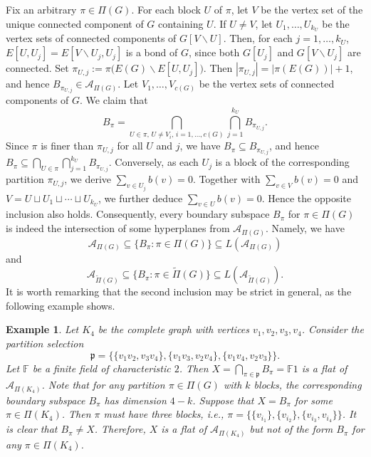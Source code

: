 \documentclass[12pt]{article}%
\renewcommand*{\bm}[1]{#1}%
\numberwithin{equation}{section}
\newtheorem{example}[example]{Example}
\begin{document}
Fix an arbitrary $\pi\in\Pi(G)$. For each block $U$ of $\pi$, let $V$ be the vertex set of the unique connected component of $G$ containing $U$. If $U\ne V$, let $U_1,\ldots,U_{k_U}$ be the vertex sets of connected components of $G[V\smallsetminus U]$. Then, for each $j=1,\ldots,k_U$, $E[U,U_j]=E[V\smallsetminus U_j,U_j]$ is a bond of $G$, since both $G[U_j]$ and $G[V\smallsetminus U_j]$ are connected. Set $\pi_{U,j}:=\pi\big(E(G)\smallsetminus E[U,U_j]\big)$. Then $|\pi_{U,j}|=|\pi(E(G))|+1$, and hence $B_{\pi_{U,j}}\in\mathcal{A}_{\Pi(G)}$. Let $V_1,\ldots, V_{c(G)}$ be the vertex sets of connected components of $G$. We claim that 
\[
B_\pi=\bigcap_{U\in\pi,\, U\ne V_i,\,i=1,\ldots, c(G)}\bigcap_{j=1}^{k_U}B_{\pi_{U,j}}.
\] 
Since $\pi$ is finer than $\pi_{U,j}$ for all $U$ and $j$, we have $B_\pi\subseteq B_{\pi_{U,j}}$, and hence $B_\pi\subseteq\bigcap_{U\in\pi}\bigcap_{j=1}^{k_U}B_{\pi_{U,j}}$. Conversely, as each $U_j$ is a block of the corresponding partition $\pi_{U,j}$, we derive $\sum_{v\in U_j}\bm b(v)=0$. Together with $\sum_{v\in V}\bm b(v)=0$ and $V=U\sqcup U_1\sqcup\cdots\sqcup U_{k_U}$, we further deduce $\sum_{v\in U}\bm b(v)=0$. Hence the opposite inclusion also holds. Consequently, every boundary subspace $B_\pi$ for $\pi\in\Pi(G)$ is indeed the intersection of some hyperplanes from $\mathcal{A}_{\Pi(G)}$. Namely, we have 
\[
\mathcal{A}_{\Pi(G)}\subseteq\big\{B_\pi:\pi\in\Pi(G)\big\}\subseteq L(\mathcal{A}_{\Pi(G)})
\]
and
\begin{equation}\label{Semilattice-Partition}
 \mathcal{A}_{\tilde{\Pi}(G)}\subseteq\big\{B_\pi:\pi\in\tilde{\Pi}(G)\big\}\subseteq L(\mathcal{A}_{\tilde{\Pi}(G)}).
\end{equation}
It is worth remarking that the second inclusion may be strict in general, as the following example shows.
\begin{example}{\rm
Let $K_4$ be the complete graph with vertices $v_1,v_2,v_3,v_4$. Consider the partition selection 
\[
\mathfrak{p}=\big\{\{v_1v_2,v_3v_4\},\{v_1v_3,v_2v_4\},\{v_1v_4,v_2v_3\}\big\}.
\]
Let $\mathbb{F}$ be a finite field of characteristic $2$. Then $X=\bigcap_{\pi\in\mathfrak{p}}B_\pi=\mathbb{F}\bm 1$ is a flat of $\mathcal{A}_{\Pi(K_4)}$. Note that for any partition $\pi\in\Pi(G)$ with $k$ blocks, the corresponding boundary subspace $B_\pi$ has dimension $4-k$. Suppose that $X=B_\pi$ for some $\pi\in\Pi(K_4)$. Then $\pi$ must have three blocks, i.e., $\pi=\big\{\{v_{i_1}\},\{v_{i_2}\},\{v_{i_3},v_{i_4}\}\big\}$. It is clear that $B_\pi\ne X$. Therefore, $X$ is a flat of $\mathcal{A}_{\Pi(K_4)}$ but not of the form $B_\pi$ for any $\pi\in\Pi(K_4)$.
}
\end{example}
\end{document}
